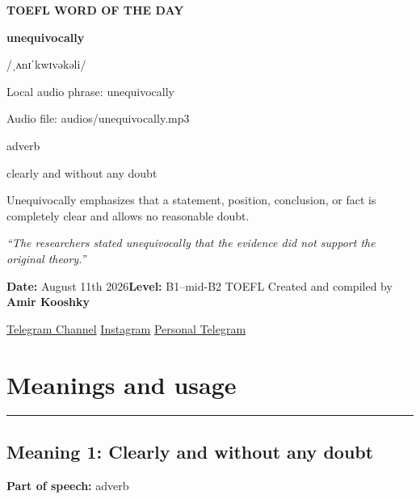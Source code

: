 \documentclass[11pt]{article}
\newcommand{\sectionrule}{\par\vspace{-0.5em}\noindent\textcolor{Accent}{\rule{\linewidth}{0.6pt}}\par}
\begin{document}
\begin{center}
{\sffamily\bfseries\color{Accent} TOEFL WORD OF THE DAY\par}
\vspace{8mm}
{\fontsize{42}{48}\selectfont\bfseries unequivocally\par}
\vspace{2mm}
{\Large\sffamily\color{Accent} /ˌʌnɪˈkwɪvəkəli/\par}
\vspace{2mm}
{\small\sffamily Local audio phrase: unequivocally\par}
{\small\sffamily Audio file: audios/unequivocally.mp3\par}
\vspace{2mm}
{\large\sffamily\color{Muted} adverb\par}
\vspace{5mm}
{\sffamily clearly and without any doubt\par}
\vspace{6mm}
{\large Unequivocally emphasizes that a statement, position, conclusion, or fact is completely clear and allows no reasonable doubt.\par}
\vspace{6mm}
\begin{minipage}{0.84\textwidth}
\itshape “The researchers stated unequivocally that the evidence did not support the original theory.”
\end{minipage}\par
\vspace{10mm}
\textbf{Date:} August 11th 2026\quad\textbullet\quad \textbf{Level:} B1--mid-B2 TOEFL
\vfill
Created and compiled by \textbf{Amir Kooshky}\par
\vspace{2mm}
\href{https://t.me/KooshkyTOEFL}{Telegram Channel}\quad\textbullet\quad
\href{https://www.instagram.com/kooshkytoefl}{Instagram}\quad\textbullet\quad
\href{https://t.me/KooshkyTOEFL\_pv}{Personal Telegram}
\end{center}
\newpage
\tableofcontents
\newpage

\section{Meanings and usage}
\sectionrule
\subsection{Meaning 1: Clearly and without any doubt}
\textbf{Part of speech:} adverb
\end{document}
